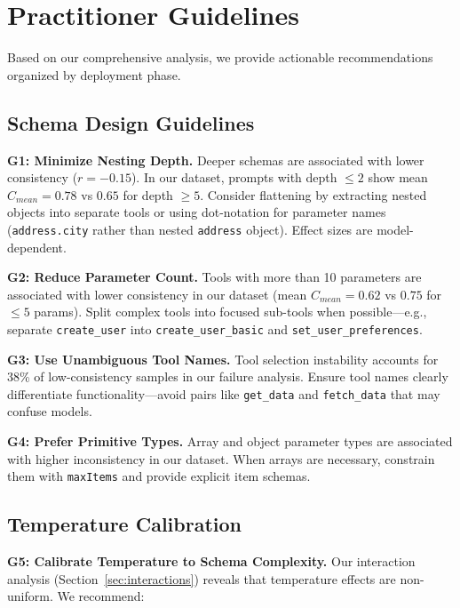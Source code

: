 \documentclass[sigconf,anonymous,review]{acmart}
\begin{document}
\section{Practitioner Guidelines}
\label{sec:guidelines}

Based on our comprehensive analysis, we provide actionable recommendations organized by deployment phase.

\subsection{Schema Design Guidelines}

\textbf{G1: Minimize Nesting Depth.} Deeper schemas are associated with lower consistency ($r=-0.15$). In our dataset, prompts with depth $\leq 2$ show mean $C_{mean}=0.78$ vs $0.65$ for depth $\geq 5$. Consider flattening by extracting nested objects into separate tools or using dot-notation for parameter names (\texttt{address.city} rather than nested \texttt{address} object). Effect sizes are model-dependent.

\textbf{G2: Reduce Parameter Count.} Tools with more than 10 parameters are associated with lower consistency in our dataset (mean $C_{mean}=0.62$ vs $0.75$ for $\leq 5$ params). Split complex tools into focused sub-tools when possible---e.g., separate \texttt{create\_user} into \texttt{create\_user\_basic} and \texttt{set\_user\_preferences}.

\textbf{G3: Use Unambiguous Tool Names.} Tool selection instability accounts for 38\% of low-consistency samples in our failure analysis. Ensure tool names clearly differentiate functionality---avoid pairs like \texttt{get\_data} and \texttt{fetch\_data} that may confuse models.

\textbf{G4: Prefer Primitive Types.} Array and object parameter types are associated with higher inconsistency in our dataset. When arrays are necessary, constrain them with \texttt{maxItems} and provide explicit item schemas.

\subsection{Temperature Calibration}

\textbf{G5: Calibrate Temperature to Schema Complexity.} Our interaction analysis (Section~\ref{sec:interactions}) reveals that temperature effects are non-uniform. We recommend:
\end{document}
